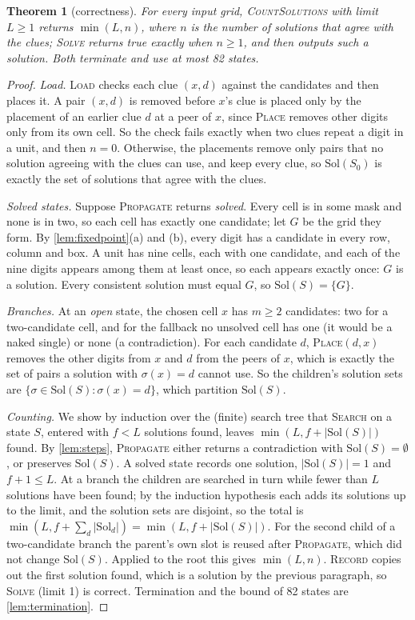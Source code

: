 \documentclass[11pt]{article}
\newtheorem{theorem}{Theorem}
\theoremstyle{definition}
\theoremstyle{plain}
\let\origtextsc\textsc
\renewcommand{\textsc}[1]{\textup{\origtextsc{#1}}}
\begin{document}
\begin{theorem}[correctness]
\label{thm:correct}
For every input grid, \textsc{CountSolutions} with limit $L\ge 1$ returns $\min(L, n)$, where $n$ is the number of
solutions that agree with the clues; \textsc{Solve} returns true exactly when $n\ge 1$, and then outputs such a
solution. Both terminate and use at most 82 states.
\end{theorem}
\begin{proof}
\emph{Load.} \textsc{Load} checks each clue $(x,d)$ against the candidates and then places it. A pair $(x,d)$ is removed
before $x$'s clue is placed only by the placement of an earlier clue $d$ at a peer of $x$, since \textsc{Place} removes
other digits only from its own cell. So the check fails exactly when two clues repeat a digit in a unit, and then
$n=0$. Otherwise, the placements remove only pairs that no solution agreeing with the clues can use, and keep every
clue, so $\mathrm{Sol}(S_0)$ is exactly the set of solutions that agree with the clues.

\emph{Solved states.} Suppose \textsc{Propagate} returns \emph{solved}. Every cell is in some mask and none is in two,
so each cell has exactly one candidate; let $G$ be the grid they form. By \cref{lem:fixedpoint}(a) and (b), every digit
has a candidate in every row, column and box. A unit has nine cells, each with one candidate, and each of the nine
digits appears among them at least once, so each appears exactly once: $G$ is a solution. Every consistent solution
must equal $G$, so $\mathrm{Sol}(S)=\{G\}$.

\emph{Branches.} At an \emph{open} state, the chosen cell $x$ has $m\ge 2$ candidates: two for a two-candidate cell, and
for the fallback no unsolved cell has one (it would be a naked single) or none (a contradiction). For each candidate
$d$, \textsc{Place}$(d, x)$ removes the other digits from $x$ and $d$ from the peers of $x$, which is exactly the set of
pairs a solution with $\sigma(x)=d$ cannot use. So the children's solution sets are $\{\sigma\in\mathrm{Sol}(S):
\sigma(x)=d\}$, which partition $\mathrm{Sol}(S)$.

\emph{Counting.} We show by induction over the (finite) search tree that \textsc{Search} on a state $S$, entered with
$f<L$ solutions found, leaves $\min(L, f+|\mathrm{Sol}(S)|)$ found. By \cref{lem:steps}, \textsc{Propagate} either
returns a contradiction with $\mathrm{Sol}(S)=\emptyset$, or preserves $\mathrm{Sol}(S)$. A solved state records one
solution, $|\mathrm{Sol}(S)|=1$ and $f+1\le L$. At a branch the children are searched in turn while fewer than $L$
solutions have been found; by the induction hypothesis each adds its solutions up to the limit, and the solution sets
are disjoint, so the total is $\min(L, f+\sum_d|\mathrm{Sol}_d|)=\min(L, f+|\mathrm{Sol}(S)|)$. For the second child of a
two-candidate branch the parent's own slot is reused after \textsc{Propagate}, which did not change
$\mathrm{Sol}(S)$. Applied to the root this gives $\min(L,n)$. \textsc{Record} copies out the first solution found,
which is a solution by the previous paragraph, so \textsc{Solve} (limit 1) is correct. Termination and the bound of 82
states are \cref{lem:termination}.
\end{proof}
\end{document}
